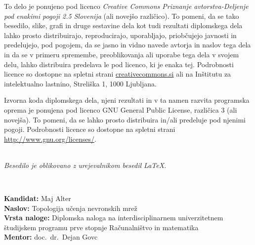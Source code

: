 \newpage
\thispagestyle{empty}

\vspace*{5cm}
{\small \noindent
  To delo je ponujeno pod licenco \textit{Creative Commons Priznanje avtorstva-Deljenje pod enakimi pogoji 2.5 Slovenija} (ali novej\v so razli\v cico).
  To pomeni, da se tako besedilo, slike, grafi in druge sestavine dela kot tudi rezultati diplomskega dela lahko prosto distribuirajo,
  reproducirajo, uporabljajo, priobčujejo javnosti in predelujejo, pod pogojem, da se jasno in vidno navede avtorja in naslov tega
  dela in da se v primeru spremembe, preoblikovanja ali uporabe tega dela v svojem delu, lahko distribuira predelava le pod
  licenco, ki je enaka tej.
  Podrobnosti licence so dostopne na spletni strani \href{http://creativecommons.si}{creativecommons.si} ali na Inštitutu za
  intelektualno lastnino, Streliška 1, 1000 Ljubljana.

  \vspace*{1cm}
  \begin{center}%
    \hspace*{1ex}\hspace*{1ex}%
  \end{center}
}

\vspace*{1cm}
{\small \noindent
  Izvorna koda diplomskega dela, njeni rezultati in v ta namen razvita programska oprema je ponujena pod licenco GNU General Public License,
  različica 3 (ali novejša). To pomeni, da se lahko prosto distribuira in/ali predeluje pod njenimi pogoji.
  Podrobnosti licence so dostopne na spletni strani \url{http://www.gnu.org/licenses/}.
}

\vfill
\begin{center}
  \ \\ \vfill
  {\em
    Besedilo je oblikovano z urejevalnikom besedil \LaTeX.}
\end{center}

\clearemptydoublepage{}

\thispagestyle{empty}
\
\vfill

\bigskip
\noindent\textbf{Kandidat:} Maj Alter\\
\noindent\textbf{Naslov:} Topologija učenja nevronskih mrež\\
\noindent\textbf{Vrsta naloge:} Diplomska naloga na interdisciplinarnem univerzitetnem študijskem programu prve stopnje Računalništvo in matematika \\
\noindent\textbf{Mentor:} doc.\ dr.\ Dejan Govc\\

